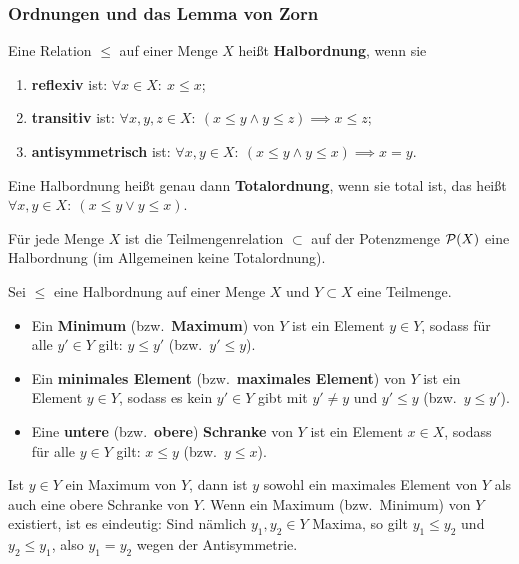 \subsubsection*{Ordnungen und das Lemma von Zorn}
\begin{definition}
Eine Relation $\le$ auf einer Menge $X$ heißt \textbf{Halbordnung}, wenn sie
\begin{enumerate}
    \item \textbf{reflexiv} ist: $\forall x\in X:\ x\le x$;
    \item \textbf{transitiv} ist: $\forall x,y,z\in X:\ (x\le y\land y\le z)\implies x\le z$;
    \item \textbf{antisymmetrisch} ist: $\forall x,y\in X:\ (x\le y\land y\le x)\implies x=y$.
\end{enumerate}
Eine Halbordnung heißt genau dann \textbf{Totalordnung}, wenn sie total ist,
das heißt $\forall x,y\in X:\ (x\le y\lor y\le x)$.
\end{definition}

\begin{beispiel}
Für jede Menge $X$ ist die Teilmengenrelation $\subset$ auf der
Potenzmenge $\mathcal{P}(X)$ eine Halbordnung (im Allgemeinen keine Totalordnung).
\end{beispiel}

\begin{definition}
Sei $\le$ eine Halbordnung auf einer Menge $X$ und $Y\subset X$ eine Teilmenge.
\begin{itemize}
    \item Ein \textbf{Minimum} (bzw.\ \textbf{Maximum}) von $Y$ ist ein Element
    $y\in Y$, sodass für alle $y'\in Y$ gilt: $y\le y'$ (bzw.\ $y'\le y$).
    \item Ein \textbf{minimales Element} (bzw.\ \textbf{maximales Element}) von $Y$
    ist ein Element $y\in Y$, sodass es kein $y'\in Y$ gibt mit $y'\ne y$ und
    $y'\le y$ (bzw.\ $y\le y'$).
    \item Eine \textbf{untere} (bzw.\ \textbf{obere}) \textbf{Schranke} von $Y$
    ist ein Element $x\in X$, sodass für alle $y\in Y$ gilt:
    $x\le y$ (bzw.\ $y\le x$).
\end{itemize}
\end{definition}

\begin{bemerkung}
Ist $y\in Y$ ein Maximum von $Y$, dann ist $y$ sowohl ein maximales Element
von $Y$ als auch eine obere Schranke von $Y$.
Wenn ein Maximum (bzw.\ Minimum) von $Y$ existiert, ist es eindeutig:
Sind nämlich $y_1,y_2\in Y$ Maxima, so gilt $y_1\le y_2$ und $y_2\le y_1$,
also $y_1=y_2$ wegen der Antisymmetrie.
\end{bemerkung}

